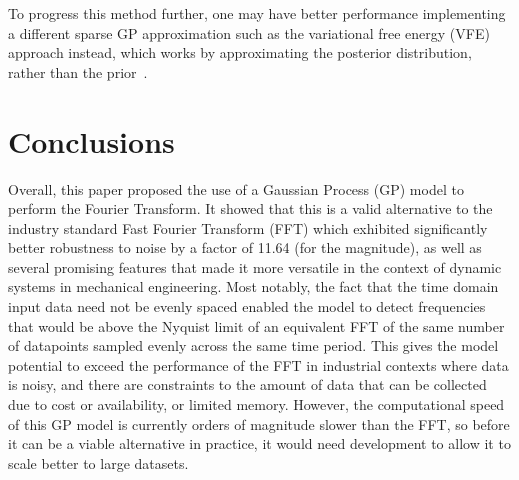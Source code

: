 \documentclass[12pt]{article}
\begin{document}
    To progress this method further, one may have better performance implementing a different sparse GP approximation such as the variational free energy (VFE) approach instead, which works by approximating the posterior distribution, rather than the prior~\cite{murphy2023probabilistic}.


    \section{Conclusions}
    Overall, this paper proposed the use of a Gaussian Process (GP) model to perform the Fourier Transform.
    It showed that this is a valid alternative to the industry standard Fast Fourier Transform (FFT) which exhibited significantly better robustness to noise by a factor of 11.64 (for the magnitude), as well as several promising features that made it more versatile in the context of dynamic systems in mechanical engineering.
    Most notably, the fact that the time domain input data need not be evenly spaced enabled the model to detect frequencies that would be above the Nyquist limit of an equivalent FFT of the same number of datapoints sampled evenly across the same time period.
    This gives the model potential to exceed the performance of the FFT in industrial contexts where data is noisy, and there are constraints to the amount of data that can be collected due to cost or availability, or limited memory.
    However, the computational speed of this GP model is currently orders of magnitude slower than the FFT, so before it can be a viable alternative in practice, it would need development to allow it to scale better to large datasets.

    \FloatBarrier

    \newpage
    \printbibliography
    \newpage
    
\end{document}
